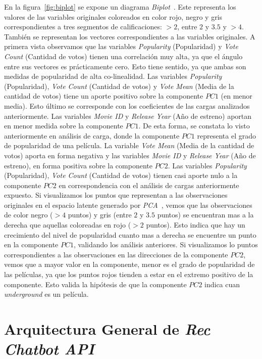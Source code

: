 \documentclass[11pt,a4paper,twoside]{thesis}
\begin{document}
En la figura~\ref{fig:biplot} se expone un diagrama
\textit{Biplot}~\cite{biplot}. Este representa los valores de las variables
originales coloreados en color rojo, negro y gris correspondientes a tres
segmentos de calificaciones: $>2$, entre $2$ y $3.5$ y $>4$. También se
representan los vectores correspondientes a las variables originales. A primera
vista observamos que las variables \textit{Popularity} (Popularidad) y
\textit{Vote Count} (Cantidad de votos) tienen una correlación muy alta, ya que
el ángulo entre sus vectores es prácticamente cero. Esto tiene sentido, ya que
ambas son medidas de popularidad de alta co-linealidad. Las variables
\textit{Popularity} (Popularidad), \textit{Vote Count} (Cantidad de votos) y
\textit{Vote Mean} (Media de la cantidad de votos) tiene un aporte positivo
sobre la componente $PC1$ (en menor media). Esto último se corresponde con los
coeficientes de las cargas analizados anteriormente. Las variables
\textit{Movie ID} y \textit{Release Year} (Año de estreno) aportan en menor
medida sobre la componente $PC1$. De esta forma, se constata lo visto
anteriormente en análisis de carga, donde la componente $PC1$ representa el
grado de popularidad de una película. La variable \textit{Vote Mean} (Media de
la cantidad de votos) aporta en forma negativa y las variables \textit{Movie ID
} y \textit{Release Year} (Año de estreno), en forma positiva sobre la
componente $PC2$. Las variables \textit{Popularity} (Popularidad), \textit{Vote
	Count} (Cantidad de votos) tienen casi aporte nulo a la componente $PC2$ en
correspondencia con el análisis de cargas anteriormente expuesto. Si
visualizamos los puntos que representan a las observaciones originales en el
espacio latente generado por \textit{PCA}~\cite{pca}, vemos que las
observaciones de color negro ($>4$ puntos) y gris (entre $2$ y $3.5$ puntos) se
encuentran mas a la derecha que aquellas coloreadas en rojo ($>2$ puntos). Esto
indica que hay un crecimiento del nivel de popularidad cuanto mas a derecha se
encuentre un punto en la componente $PC1$, validando los análisis anteriores.
Si visualizamos lo puntos correspondientes a las observaciones en las
direcciones de la componente $PC2$, vemos que a mayor valor en la componente,
menor es el grado de popularidad de las películas, ya que los puntos rojos
tienden a estar en el extremo positivo de la componente. Esto valida la
hipótesis de que la componente $PC2$ indica cuan \textit{underground} es un
película.


\chapter{Arquitectura General de \textit{Rec Chatbot API}}
\label{sec:arq-general}
\end{document}
